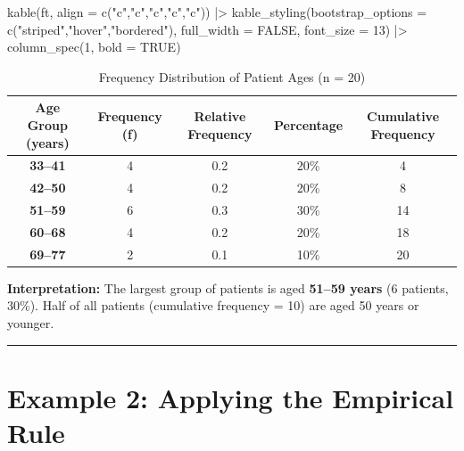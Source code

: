 \documentclass[
  12pt,
  letterpaper,
]{book}
\newenvironment{Shaded}{\begin{snugshade}}{\end{snugshade}}
\newcommand{\AttributeTok}[1]{\textcolor[rgb]{0.40,0.45,0.13}{#1}}
\newcommand{\ConstantTok}[1]{\textcolor[rgb]{0.56,0.35,0.01}{#1}}
\newcommand{\DecValTok}[1]{\textcolor[rgb]{0.68,0.00,0.00}{#1}}
\newcommand{\FunctionTok}[1]{\textcolor[rgb]{0.28,0.35,0.67}{#1}}
\newcommand{\NormalTok}[1]{\textcolor[rgb]{0.00,0.23,0.31}{#1}}
\newcommand{\SpecialCharTok}[1]{\textcolor[rgb]{0.37,0.37,0.37}{#1}}
\newcommand{\StringTok}[1]{\textcolor[rgb]{0.13,0.47,0.30}{#1}}
\begin{document}
\begin{tcolorbox}
\begin{Shaded}
\begin{Highlighting}[]
\FunctionTok{kable}\NormalTok{(ft, }\AttributeTok{align =} \FunctionTok{c}\NormalTok{(}\StringTok{"c"}\NormalTok{,}\StringTok{"c"}\NormalTok{,}\StringTok{"c"}\NormalTok{,}\StringTok{"c"}\NormalTok{,}\StringTok{"c"}\NormalTok{)) }\SpecialCharTok{|\textgreater{}}
  \FunctionTok{kable\_styling}\NormalTok{(}\AttributeTok{bootstrap\_options =} \FunctionTok{c}\NormalTok{(}\StringTok{"striped"}\NormalTok{,}\StringTok{"hover"}\NormalTok{,}\StringTok{"bordered"}\NormalTok{),}
                \AttributeTok{full\_width =} \ConstantTok{FALSE}\NormalTok{, }\AttributeTok{font\_size =} \DecValTok{13}\NormalTok{) }\SpecialCharTok{|\textgreater{}}
  \FunctionTok{column\_spec}\NormalTok{(}\DecValTok{1}\NormalTok{, }\AttributeTok{bold =} \ConstantTok{TRUE}\NormalTok{)}
\end{Highlighting}
\end{Shaded}

\begingroup\fontsize{13}{15}\selectfont

\begin{longtable}[t]{>{}ccccc}

\caption{\label{tbl-ex1}Frequency Distribution of Patient Ages (n = 20)}

\tabularnewline

\toprule
Age Group (years) & Frequency (f) & Relative Frequency & Percentage & Cumulative Frequency\\
\midrule
\textbf{33–41} & 4 & 0.2 & 20\% & 4\\
\textbf{42–50} & 4 & 0.2 & 20\% & 8\\
\textbf{51–59} & 6 & 0.3 & 30\% & 14\\
\textbf{60–68} & 4 & 0.2 & 20\% & 18\\
\textbf{69–77} & 2 & 0.1 & 10\% & 20\\
\bottomrule

\end{longtable}

\endgroup{}

\textbf{Interpretation:} The largest group of patients is aged
\textbf{51--59 years} (6 patients, 30\%). Half of all patients
(cumulative frequency = 10) are aged 50 years or younger.

\end{tcolorbox}

\begin{center}\rule{0.5\linewidth}{0.5pt}\end{center}

\section{Example 2: Applying the Empirical
Rule}\label{example-2-applying-the-empirical-rule}
\end{document}
